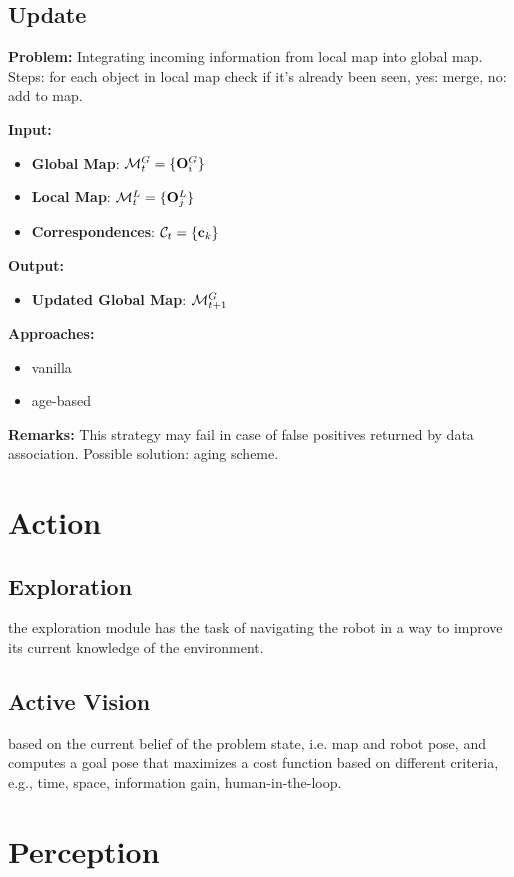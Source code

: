 \documentclass{article}
\begin{document}
	\subsection{Update} 
	
	{\bf Problem: } Integrating incoming information from local map into global map. Steps: for each object in local map check if it's already been seen, yes: merge, no: add to map. 
	
	\noindent
	{\bf Input: }
	\begin{itemize}
		\item {\bf Global Map}: $\mathcal{M}_t^G = \{ \mathbf{O}_i^G \}$
		\item {\bf Local Map}: $\mathcal{M}_t^L = \{ \mathbf{O}_j^L \}$
		\item {\bf Correspondences}: $\mathcal{C}_t = \{ \mathbf{c}_k\}$		
	\end{itemize}
	\noindent
	{\bf Output: }
	\begin{itemize}
		\item {\bf Updated Global Map}: $\mathcal{M}_{t+1}^G$
	\end{itemize}
	\noindent
	{\bf Approaches: }
	\begin{itemize}
		\item vanilla
		\item age-based
	\end{itemize}
	\noindent
	{\bf Remarks: } This strategy may fail in case of false positives returned by data association. Possible solution:  aging scheme.
	
		
	\section{Action}
	
	\subsection{Exploration} the exploration module has the task of navigating the robot in a way to improve its current knowledge of the environment. 
	
	\subsection{Active Vision} based on the current belief of the problem state, i.e. map and robot pose, and computes a goal pose that maximizes a cost function based on different criteria, e.g., time, space, information gain, human-in-the-loop.
		
	\section{Perception}
\end{document}

